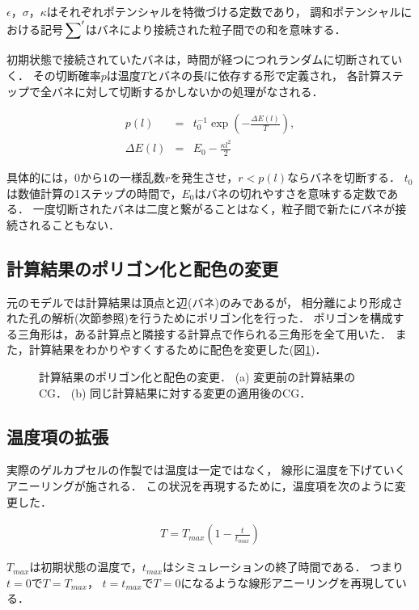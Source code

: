 $\epsilon$，$\sigma$，$\kappa$はそれぞれポテンシャルを特徴づける定数であり，
調和ポテンシャルにおける記号$\sideset{}{'}\sum$はバネにより接続された粒子間での和を意味する．

初期状態で接続されていたバネは，時間が経つにつれランダムに切断されていく．
その切断確率$p$は温度$T$とバネの長$l$に依存する形で定義され，
各計算ステップで全バネに対して切断するかしないかの処理がなされる．

\begin{eqnarray}
p(l)
&=&
t_0^{-1}
\exp\left(-\frac{\Delta E(l)}{T}\right)
,\\
\Delta E(l)
&=&
E_0-\frac{\kappa l^2}{2}
\end{eqnarray}

具体的には，$0$から$1$の一様乱数$r$を発生させ，$r<p(l)$ならバネを切断する．
$t_0$は数値計算の1ステップの時間で，$E_0$はバネの切れやすさを意味する定数である．
一度切断されたバネは二度と繋がることはなく，粒子間で新たにバネが接続されることもない．


\subsection{計算結果のポリゴン化と配色の変更}

元のモデルでは計算結果は頂点と辺(バネ)のみであるが，
相分離により形成された孔の解析(次節参照)を行うためにポリゴン化を行った．
ポリゴンを構成する三角形は，ある計算点と隣接する計算点で作られる三角形を全て用いた．
また，計算結果をわかりやすくするために配色を変更した(図\ref{fig:model_2d})．

\begin{figure}
\centering

\caption{
    計算結果のポリゴン化と配色の変更．
    (a) 変更前の計算結果のCG．
    (b) 同じ計算結果に対する変更の適用後のCG．
}
\label{fig:model_2d}
\end{figure}


\subsection{温度項の拡張}
実際のゲルカプセルの作製では温度は一定ではなく，
線形に温度を下げていくアニーリングが施される．
この状況を再現するために，温度項を次のように変更した．

\begin{eqnarray}
\label{eq:thermal}
T = T_{max}(1-\frac{t}{t_{max}})
\end{eqnarray}

$T_{max}$は初期状態の温度で，$t_{max}$はシミュレーションの終了時間である．
つまり$t=0$で$T=T_{max}$，
$t=t_{max}$で$T=0$になるような線形アニーリングを再現している．


